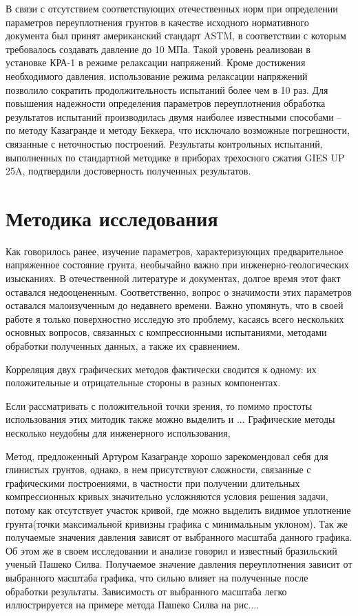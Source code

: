 В связи с отсутствием соответствующих отечественных норм при определении параметров переуплотнения грунтов в качестве исходного нормативного документа был принят американский стандарт ASTM, в соответствии с которым требовалось создавать давление до 10 МПа. Такой уровень реализован в установке КРА-1 в режиме релаксации напряжений. Кроме достижения необходимого давления, использование режима релаксации напряжений позволило сократить продолжительность испытаний более чем в 10 раз. 
Для повышения надежности определения параметров переуплотнения обработка результатов испытаний производилась двумя наиболее известными способами – по методу Казагранде и методу Беккера, что исключало возможные погрешности, связанные с неточностью построений. Результаты контрольных испытаний, выполненных по стандартной методике в приборах трехосного сжатия GIES UP 25A, подтвердили достоверность полученных результатов.


  \chapter{Методика исследования}

Как говорилось ранее, изучение параметров, характеризующих предварительное напряженное состояние грунта, необычайно важно при инженерно-геологических изысканиях. В отечественной литературе и документах, долгое время этот факт оставался недооцененным. Соответственно, вопрос о значимости этих параметров оставался малоизученным до недавнего времени. Важно упомянуть, что в своей работе я только поверхностно исследую это проблему,  касаясь всего нескольких основных вопросов, связанных с компрессионными испытаниями, методами обработки полученных данных, а также их сравнением.

Корреляция двух графических методов фактически сводится к одному: их положительные и отрицательные стороны в разных компонентах. 

Если рассматривать с положительной точки зрения, то помимо простоты использования этих митодик также можно выделить и 
...
Графические методы несколько неудобны для инженерного использования, 
 
 Метод, предложенный Артуром Казагранде хорошо зарекомендовал себя для глинистых грунтов, однако, в нем присутствуют сложности, связанные с графическими построениями, в частности при получении длительных компрессионных кривых значительно усложняются условия решения задачи, потому как отсутствует участок кривой, где можно выделить видимое уплотнение грунта(точки максимальной кривизны графика с минимальным уклоном). Так же получаемые значения давления зависят от выбранного масштаба данного графика. Об этом же в своем исследовании и анализе говорил и известный бразильский ученый Пашеко Силва. Получаемое значение давления переуплотнения зависит от выбранного масштаба графика, что сильно влияет на полученные после обработки результаты.
 Зависимость от выбранного масштаба легко иллюстрируется на примере метода Пашеко Силва на рис....

